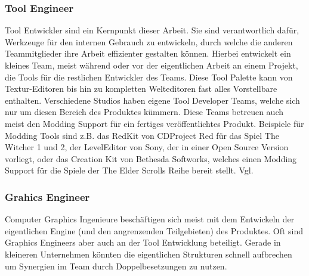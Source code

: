 \documentclass[pagesize, paper=a4, fontsize=12pt, titlepage=true, headings=small, headnosepline, abstractoff, liststotoc, nochapterprefix, plainheadsepline, twoside]{scrreprt}
\begin{document}
\subsubsection{Tool Engineer}
Tool Entwickler sind ein Kernpunkt dieser Arbeit. Sie sind verantwortlich dafür, Werkzeuge für den internen Gebrauch zu entwickeln, durch welche die anderen Teammitglieder ihre Arbeit effizienter gestalten können. Hierbei entwickelt ein kleines Team, meist während oder vor der eigentlichen Arbeit an einem Projekt, die Tools für die restlichen Entwickler des Teams. Diese Tool Palette kann von Textur-Editoren bis hin zu kompletten Welteditoren fast alles Vorstellbare enthalten. Verschiedene Studios haben eigene Tool Developer Teams, welche sich nur um diesen Bereich des Produktes kümmern. Diese Teams betreuen auch meist den Modding Support für ein fertiges veröffentlichtes Produkt. Beispiele für Modding Tools sind z.B. das RedKit von CDProject Red für das Spiel The Witcher 1 und 2, der LevelEditor von Sony, der in einer Open Source Version vorliegt, oder das Creation Kit von Bethesda Softworks, welches einen Modding Support für die Spiele der The Elder Scrolls Reihe bereit stellt. Vgl. \parencite[S. 27 ]{Chandler2006}

\subsubsection{Grahics Engineer}
Computer Graphics Ingenieure beschäftigen sich meist mit dem Entwickeln der eigentlichen Engine (und den angrenzenden Teilgebieten) des Produktes. Oft sind Graphics Engineers aber auch an der Tool Entwicklung beteiligt. Gerade in kleineren Unternehmen könnten die eigentlichen Strukturen schnell aufbrechen um Synergien im Team durch Doppelbesetzungen zu nutzen. \parencite[S. 27 ]{Chandler2006}
\end{document}
